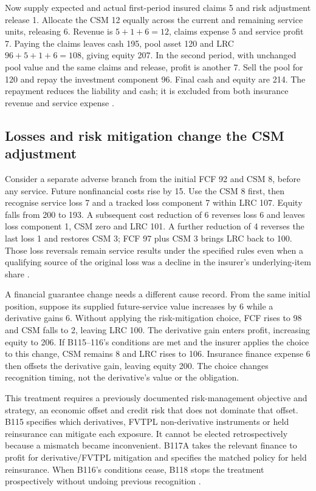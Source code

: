 Now supply expected and actual first-period insured claims 5 and risk
adjustment release 1. Allocate the CSM 12 equally across the current and
remaining service units, releasing 6. Revenue is \(5+1+6=12\), claims
expense 5 and service profit 7. Paying the claims leaves cash 195, pool
asset 120 and LRC \(96+5+1+6=108\), giving equity 207. In the second
period, with unchanged pool value and the same claims and release, profit
is another 7. Sell the pool for 120 and repay the investment component 96.
Final cash and equity are 214. The repayment reduces the liability and
cash; it is excluded from both insurance revenue and service expense
\citep[IFRS~17.81,83--85,B119]{eu20231803}.

\subsection{Losses and risk mitigation change the CSM adjustment}

Consider a separate adverse branch from the initial FCF 92 and CSM 8,
before any service. Future nonfinancial costs rise by 15. Use the CSM 8
first, then recognise service loss 7 and a tracked loss component 7 within
LRC 107. Equity falls from 200 to 193. A subsequent cost reduction of 6
reverses loss 6 and leaves loss component 1, CSM zero and LRC 101. A
further reduction of 4 reverses the last loss 1 and restores CSM 3;
FCF 97 plus CSM 3 brings LRC back to 100. Those loss reversals remain
service results under the specified rules even when a qualifying source
of the original loss was a decline in the insurer's underlying-item share
\citep[IFRS~17.45,48--50,87(c)]{eu20231803}.

A financial guarantee change needs a different cause record. From the same
initial position, suppose its supplied future-service value increases by
6 while a derivative gains 6. Without applying the risk-mitigation choice,
FCF rises to 98 and CSM falls to 2, leaving LRC 100. The derivative gain
enters profit, increasing equity to 206. If B115--116's conditions are met
and the insurer applies the choice to this change, CSM remains 8 and LRC
rises to 106. Insurance finance expense 6 then offsets the derivative gain,
leaving equity 200. The choice changes recognition timing, not the
derivative's value or the obligation.

This treatment requires a previously documented risk-management objective
and strategy, an economic offset and credit risk that does not dominate
that offset. B115 specifies which derivatives, FVTPL non-derivative
instruments or held reinsurance can mitigate each exposure. It cannot be
elected retrospectively because a mismatch became inconvenient. B117A
takes the relevant finance to profit for derivative/FVTPL mitigation and
specifies the matched policy for held reinsurance. When B116's conditions
cease, B118 stops the treatment prospectively without undoing previous
recognition \citep[IFRS~17.B115--118]{eu20231803}.
